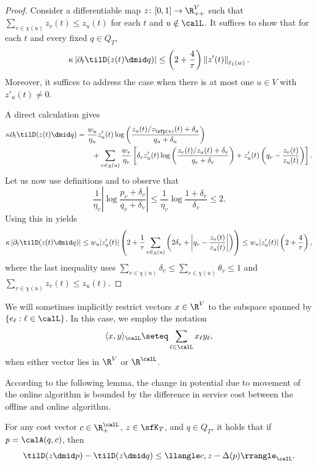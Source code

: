 \begin{proof}
	Consider a differentiable map $z\colon[0,1]\to \R_{++}^V$ such that $\sum_{v\in\chi(u)}z_v(t)\le z_u(t)$ for each $t$ and $u\notin\calL$.
	It suffices to show that for each $t$ and every fixed $q \in Q_T$,
	\[
	\kappa \left|\partial_t \tilD(z(t) \dmid q)\right| \leq \left(2+\frac{4}{\tau}\right) \left\|z'(t)\right\|_{\ell_1(w)}.
	\]
	Moreover, it suffices to address the case when there is at most one $u \in V$ with $z'_u(t) \neq 0$.
	
	A direct calculation gives
	\begin{align}
	\kappa \partial_t \tilD(z(t) \dmid q) &= \frac{w_u}{\eta_u} z'_u(t) \log \left(\frac{z_u(t)/z_{\sfp(u)}(t)+\delta_u}{q_u+\delta_u}\right) \nonumber \\
	&\qquad 
	+ \sum_{v \in \chi(u)} \frac{w_v}{\eta_v} 
	\left[\delta_v z'_u(t) \log \left(\frac{z_v(t)/z_u(t)+\delta_v}{q_v+\delta_v}\right)
	+ z'_u(t) \left(q_v - \frac{z_v(t)}{z_u(t)}\right)
	\right].\label{eq:tD}
	\end{align}
	Let us now use definitions  and 
	to observe that
	\[
	\frac{1}{\eta_v} \left|\log \frac{p_v+\delta_v}{q_v+\delta_v}\right| \leq \frac{1}{\eta_v} \log \frac{1+\delta_v}{\delta_v} \leq 2.
	\]
	Using this in  yields
	\[
	\kappa \left|\partial_t \tilD(z(t) \dmid q)\right| \leq w_u |z_u'(t)| \left(2 + \frac{1}{\tau} \sum_{v \in \chi(u)}
	\left(2\delta_v + \left|q_v-\frac{z_v(t)}{z_u(t)}\right|\right)\right)
	\leq w_u |z_u'(t)| \left(2+\frac{4}{\tau}\right),
	\]
	where the last inequality uses $\sum_{v \in \chi(u)} \delta_v \leq \sum_{v \in \chi(u)} \theta_v \leq 1$ and $\sum_{v\in\chi(u)}z_v(t)\le z_u(t)$.
\end{proof}

We will sometimes implicitly restrict vectors $x \in \R^{V}$ to the subspace spanned by $\{ e_{\ell} : \ell \in \calL \}$.
In this case, we employ the notation
\[
\langle x,y \rangle_{\calL} \seteq \sum_{\ell \in \calL} x_{\ell} y_{\ell},
\]
when either vector lies in $\R^V$ or $\R^{\calL}$.

According to the following lemma, the change in potential due to movement of the online algorithm is bounded by the difference in service cost between the offline and online algorithm.
\begin{lemma}\label{lem:sc}
	For any cost vector $c \in \R_+^{\calL}$, $z \in \sfK_T$, and $q \in Q_T$, it holds that if $p = \calA(q,c)$, then
	\[
	\tilD(z \dmid p) - \tilD(z \dmid q) \leq \llangle c, z - \Delta(p)\rrangle_{\calL}.
	\]
\end{lemma}


